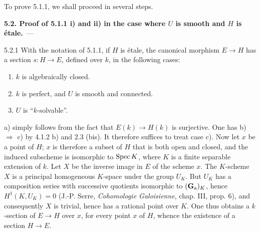 To prove 5.1.1, we shall proceed in several steps.
\par\medskip\noindent\textbf{5.2. Proof of 5.1.1 i) and ii) in the case where $U$ is smooth and $H$ is étale.}\ ---\par\label{XVII.5.2}
\begin{lemma}{5.2.1}\label{XVII.5.2.1}
With the notation of 5.1.1, if $H$ is étale, the canonical morphism $E\to H$ has a section $s:H\to E$, defined over $k$, in the following cases:
\begin{enumerate}[label=\textup{\alph*)}]
\item $k$ is algebraically closed.
\item $k$ is perfect, and $U$ is smooth and connected.
\item $U$ is ``$k$-solvable''.
\end{enumerate}
\end{lemma}
a) simply follows from the fact that $E(k)\to H(k)$ is surjective. One has b) $\Rightarrow$ c) by 4.1.2 b) and 2.3 (bis). It therefore suffices to treat case c). Now let $x$ be a point of $H$; $x$ is therefore a subset of $H$ that is both open and closed, and the induced subscheme is isomorphic to $\operatorname{Spec} K$, where $K$ is a finite separable extension of $k$. Let $X$ be the inverse image in $E$ of the scheme $x$. The $K$-scheme $X$ is a principal homogeneous $K$-space under the group $U_K$. But $U_K$ has a composition series with successive quotients isomorphic to $(\mathbf{G}_{\mathrm{a}})_K$, hence $H^1(K,U_K)=0$ (J.-P. Serre, \emph{Cohomologie Galoisienne}, chap. III, prop. 6), and consequently $X$ is trivial, hence has a rational point over $K$. One thus obtains a $k$-section of $E\to H$ over $x$, for every point $x$ of $H$, whence the existence of a section $H\to E$.

